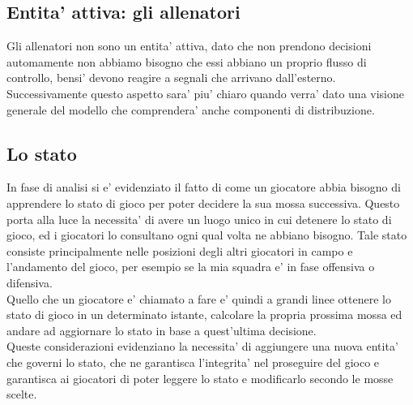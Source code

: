 \subsection*{Entita’ attiva: gli allenatori}
%
\label{sec:entita_allenatori}

Gli allenatori non sono un entita’ attiva, dato che non prendono decisioni automamente non abbiamo bisogno che essi abbiano un proprio flusso di controllo, bensi’ devono reagire a segnali che arrivano dall’esterno. Successivamente questo aspetto sara’ piu’ chiaro quando verra’ dato una visione generale del modello che comprendera’ anche componenti di distribuzione.

\subsection*{Lo stato}
%
\label{sec:entita_stato}

In fase di analisi si e' evidenziato il fatto di come un giocatore abbia bisogno di apprendere lo stato di gioco per poter decidere la sua mossa successiva. Questo porta alla luce la necessita’ di avere un luogo unico in cui detenere lo stato di gioco, ed i giocatori lo consultano ogni qual volta ne abbiano bisogno. Tale stato consiste principalmente nelle posizioni degli altri giocatori in campo e l’andamento del gioco, per esempio se la mia squadra e’ in fase offensiva o difensiva.\\

Quello che un giocatore e’ chiamato a fare e’ quindi a grandi linee ottenere lo stato di gioco in un determinato istante, calcolare la propria prossima mossa ed andare ad aggiornare lo stato in base a quest’ultima decisione.\\

Queste considerazioni evidenziano la necessita’ di aggiungere una nuova entita’ che governi lo stato, che ne garantisca l'integrita' nel proseguire del gioco e garantisca ai giocatori di poter leggere lo stato e modificarlo secondo le mosse scelte.